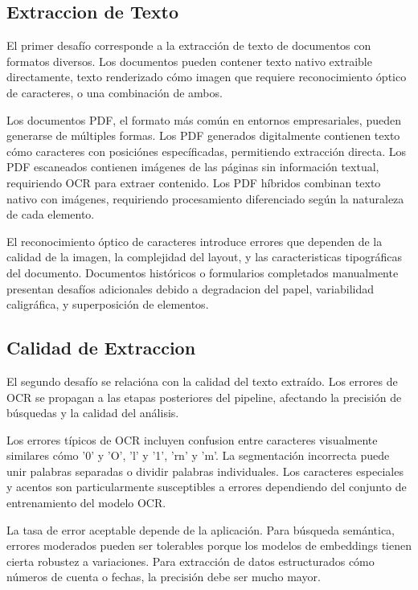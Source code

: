 \documentclass[12pt,a4paper,twoside]{book}
\begin{document}
\subsection{Extraccion de Texto}

El primer desafío corresponde a la extracción de texto de documentos con formatos diversos. Los documentos pueden contener texto nativo extraible directamente, texto renderizado cómo imagen que requiere reconocimiento óptico de caracteres, o una combinación de ambos.

Los documentos PDF, el formato más común en entornos empresariales, pueden generarse de múltiples formas. Los PDF generados digitalmente contienen texto cómo caracteres con posiciónes específicadas, permitiendo extracción directa. Los PDF escaneados contienen imágenes de las páginas sin información textual, requiriendo OCR para extraer contenido. Los PDF híbridos combinan texto nativo con imágenes, requiriendo procesamiento diferenciado según la naturaleza de cada elemento.

El reconocimiento óptico de caracteres introduce errores que dependen de la calidad de la imagen, la complejidad del layout, y las caracteristicas tipográficas del documento. Documentos históricos o formularios completados manualmente presentan desafíos adicionales debido a degradacion del papel, variabilidad caligráfica, y superposición de elementos.

\subsection{Calidad de Extraccion}

El segundo desafío se relacióna con la calidad del texto extraído. Los errores de OCR se propagan a las etapas posteriores del pipeline, afectando la precisión de búsquedas y la calidad del análisis.

Los errores típicos de OCR incluyen confusion entre caracteres visualmente similares cómo '0' y 'O', 'l' y '1', 'rn' y 'm'. La segmentación incorrecta puede unir palabras separadas o dividir palabras individuales. Los caracteres especiales y acentos son particularmente susceptibles a errores dependiendo del conjunto de entrenamiento del modelo OCR.

La tasa de error aceptable depende de la aplicación. Para búsqueda semántica, errores moderados pueden ser tolerables porque los modelos de embeddings tienen cierta robustez a variaciones. Para extracción de datos estructurados cómo números de cuenta o fechas, la precisión debe ser mucho mayor.
\end{document}
